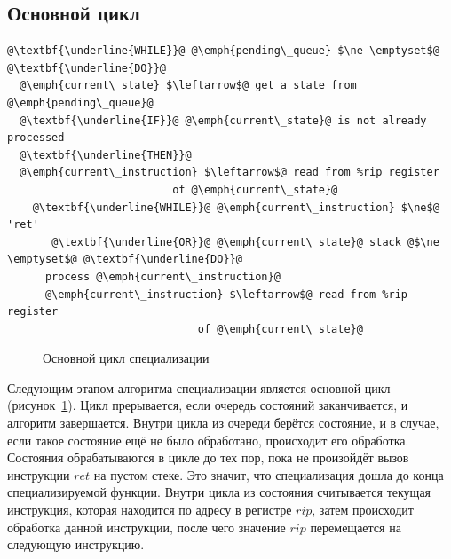 \subsection{Основной цикл}
\newsavebox\boxzero
\begin{lrbox}{\boxzero}
\begin{lstlisting}[xleftmargin = 20pt]
@\textbf{\underline{WHILE}}@ @\emph{pending\_queue} $\ne \emptyset$@ @\textbf{\underline{DO}}@
  @\emph{current\_state} $\leftarrow$@ get a state from @\emph{pending\_queue}@
  @\textbf{\underline{IF}}@ @\emph{current\_state}@ is not already processed
  @\textbf{\underline{THEN}}@
  @\emph{current\_instruction} $\leftarrow$@ read from %rip register
                          of @\emph{current\_state}@
    @\textbf{\underline{WHILE}}@ @\emph{current\_instruction} $\ne$@ 'ret'
       @\textbf{\underline{OR}}@ @\emph{current\_state}@ stack @$\ne \emptyset$@ @\textbf{\underline{DO}}@
      process @\emph{current\_instruction}@
      @\emph{current\_instruction} $\leftarrow$@ read from %rip register
                              of @\emph{current\_state}@
\end{lstlisting}
\end{lrbox}
\begin{figure}[!t]
\hspace{1cm}
\usebox\boxzero
\caption{Основной цикл специализации\label{fig:cycle}}
\end{figure}
Следующим этапом алгоритма специализации является основной цикл (рисунок~\ref{fig:cycle}).
Цикл прерывается, если очередь состояний заканчивается, и алгоритм завершается.
Внутри цикла из очереди берётся состояние, и в случае, если такое состояние ещё не было обработано, происходит его обработка.
Состояния обрабатываются в цикле до тех пор, пока не произойдёт вызов инструкции $ret$ на пустом стеке.
Это значит, что специализация дошла до конца специализируемой функции. Внутри цикла из состояния считывается текущая инструкция, которая находится по адресу в регистре $rip$, затем происходит обработка данной инструкции, после чего значение $rip$ перемещается на следующую инструкцию.

